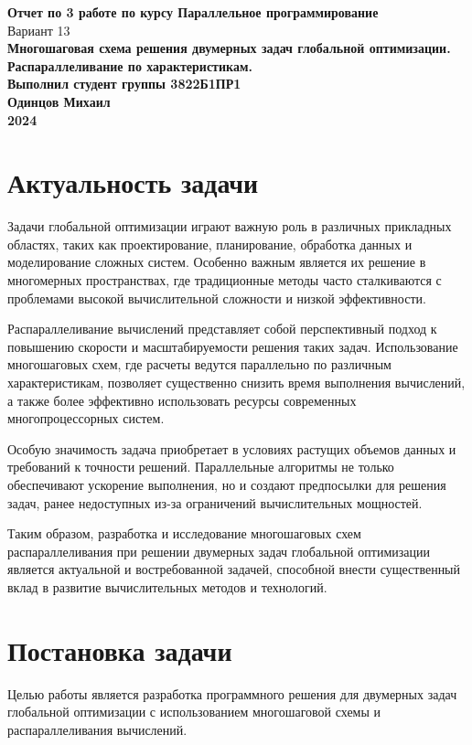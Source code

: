 \documentclass[a4paper,12pt]{article}
\begin{document}
\begin{titlepage}
    \centering
    \vspace*{5cm}
    {\Huge \textbf{Отчет по 3 работе по курсу Параллельное программирование}}\\[1cm]
    {\large Вариант 13}\\[2cm]
    \textbf{Многошаговая схема решения двумерных задач глобальной оптимизации. Распараллеливание по характеристикам.}\\[4cm]
    \textbf{Выполнил студент группы 3822Б1ПР1}\\[0.5cm]
    \textbf{Одинцов Михаил}\\[1cm]
    \textbf{2024}
\end{titlepage}

\newpage
\section*{Актуальность задачи}
Задачи глобальной оптимизации играют важную роль в различных прикладных областях, таких как проектирование, планирование, обработка данных и моделирование сложных систем. Особенно важным является их решение в многомерных пространствах, где традиционные методы часто сталкиваются с проблемами высокой вычислительной сложности и низкой эффективности.

Распараллеливание вычислений представляет собой перспективный подход к повышению скорости и масштабируемости решения таких задач. Использование многошаговых схем, где расчеты ведутся параллельно по различным характеристикам, позволяет существенно снизить время выполнения вычислений, а также более эффективно использовать ресурсы современных многопроцессорных систем.

Особую значимость задача приобретает в условиях растущих объемов данных и требований к точности решений. Параллельные алгоритмы не только обеспечивают ускорение выполнения, но и создают предпосылки для решения задач, ранее недоступных из-за ограничений вычислительных мощностей.

Таким образом, разработка и исследование многошаговых схем распараллеливания при решении двумерных задач глобальной оптимизации является актуальной и востребованной задачей, способной внести существенный вклад в развитие вычислительных методов и технологий.

\newpage
\section*{Постановка задачи}
Целью работы является разработка программного решения для двумерных задач глобальной оптимизации с использованием многошаговой схемы и распараллеливания вычислений.
\end{document}
